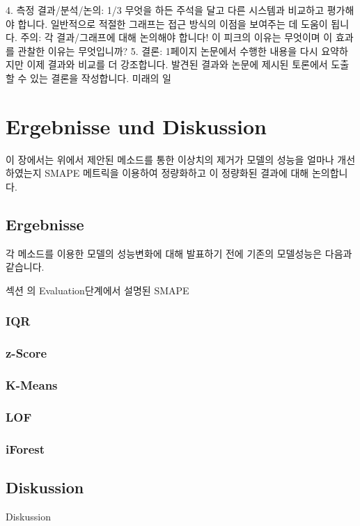4. 측정 결과/분석/논의: 1/3
무엇을 하든 주석을 달고 다른 시스템과 비교하고 평가해야 합니다.
일반적으로 적절한 그래프는 접근 방식의 이점을 보여주는 데 도움이 됩니다.
주의: 각 결과/그래프에 대해 논의해야 합니다! 이 피크의 이유는 무엇이며 이 효과를 관찰한 이유는 무엇입니까?
5. 결론: 1페이지
논문에서 수행한 내용을 다시 요약하지만 이제 결과와 비교를 더 강조합니다.
발견된 결과와 논문에 제시된 토론에서 도출할 수 있는 결론을 작성합니다.
미래의 일


\chapterpage\chapter{Ergebnisse und Diskussion}
    이 장에서는 위에서 제안된 메소드를 통한 이상치의 제거가 모델의 성능을 얼마나 개선하였는지 SMAPE 메트릭을 이용하여 정량화하고 이 정량화된 결과에 대해 논의합니다.




    \section{Ergebnisse}
        각 메소드를 이용한 모델의 성능변화에 대해 발표하기 전에 기존의 모델성능은 다음과 같습니다.

        섹션 \label{sec:Modellierung der Feinstaubkonzentration}의 Evaluation단계에서 설명된 SMAPE
        
        \subsection*{IQR}
        
        \subsection*{z-Score}
        
        \subsection*{K-Means}
        
        \subsection*{LOF}
        
        \subsection*{iForest}
        
    \section{Diskussion}
        Diskussion
